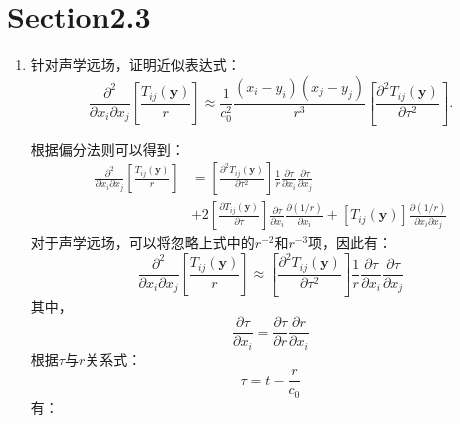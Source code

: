 \section*{Section2.3}

\begin{enumerate}
    \item 针对声学远场，证明近似表达式：
        \[ \frac{\partial^{2}}{\partial x_{i} \partial x_{j}}\left[\frac{T_{i j}(\boldsymbol{y})}{r}\right] \approx \frac{1}{c_{0}^{2}} \frac{\left(x_{i}-y_{i}\right)\left(x_{j}-y_{j}\right)}{r^{3}}\left[\frac{\partial^{2} T_{i j}(\boldsymbol{y})}{\partial \tau^{2}}\right]. \]

        根据偏分法则可以得到：
        \begin{equation}
            \begin{aligned}
                \frac{\partial^{2}}{\partial x_{i} \partial x_{j}}\left[\frac{T_{i j}(\boldsymbol{y})}{r}\right]
                &= \left[\frac{\partial^{2} T_{i j}(\mathbf{y})}{\partial \tau^{2}}\right] \frac{1}{r} \frac{\partial \tau}{\partial x_{i}} \frac{\partial \tau}{\partial x_{j}} \\
                &+ 2\left[\frac{\partial T_{i j}(\mathbf{y})}{\partial \tau}\right] \frac{\partial \tau}{\partial x_{i}} \frac{\partial(1 / r)}{\partial x_{i}}+\left[T_{i j}(\mathbf{y})\right] \frac{\partial(1 / r)}{\partial x_{i} \partial x_{j}}
            \end{aligned}
        \end{equation}
        对于声学远场，可以将忽略上式中的\(r^{-2}\)和\(r^{-3}\)项，因此有：
        \begin{equation}
            \label{eq:equation ignore r-2 r-3}
            \frac{\partial^{2}}{\partial x_{i} \partial x_{j}}\left[\frac{T_{i j}(\boldsymbol{y})}{r}\right]
            \approx \left[\frac{\partial^{2} T_{i j}(\mathbf{y})}{\partial \tau^{2}}\right] \frac{1}{r} \frac{\partial \tau}{\partial x_{i}} \frac{\partial \tau}{\partial x_{j}}
        \end{equation}
        其中，
        \begin{equation}
            \frac{\partial \tau}{\partial x_{i}}
            = \frac{\partial \tau}{\partial r} \frac{\partial r}{\partial x_{i}}
        \end{equation}
        根据\(\tau\)与\(r\)关系式：
        \begin{equation}
            \tau = t - \frac{r}{c_{0}}
        \end{equation}
        有：
        \begin{equation}

\end{equation}
\end{enumerate}
